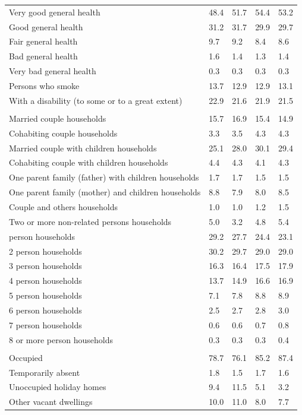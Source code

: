 \documentclass{article}
\begin{document}
\begin{table}[h]
\begin{tabular}{KTTTT}
    \hline
Very good general health & 48.4& 51.7&54.4& 53.2\\
Good general health & 31.2& 31.7& 29.9& 29.7\\
Fair general health & 9.7& 9.2&8.4& 8.6\\
Bad general health & 1.6& 1.4&1.3& 1.4\\
Very bad general health & 0.3& 0.3&0.3& 0.3\\
    \hline
Persons who smoke & 13.7& 12.9&12.9& 13.1\\
    \hline
With a disability (to some or to a great extent) & 22.9& 21.6&21.9& 21.5\\
\hline
    \\ 
    \hline
Married couple households & 15.7& 16.9& 15.4& 14.9\\
Cohabiting couple households & 3.3& 3.5& 4.3& 4.3\\
Married couple with children households & 25.1& 28.0& 30.1& 29.4\\
Cohabiting couple with children households & 4.4& 4.3& 4.1& 4.3\\
One parent family (father) with  children households & 1.7& 1.7& 1.5& 1.5\\
One parent family (mother) and children households & 8.8& 7.9& 8.0& 8.5\\
Couple and others households  & 1.0& 1.0& 1.2& 1.5\\
Two or more non-related persons households & 5.0& 3.2& 4.8& 5.4\\
     person households & 29.2& 27.7& 24.4& 23.1\\
2 person households & 30.2& 29.7& 29.0& 29.0\\
3 person households & 16.3& 16.4& 17.5& 17.9\\
4 person households & 13.7& 14.9& 16.6& 16.9\\
5 person households & 7.1& 7.8& 8.8& 8.9\\
6 person households & 2.5& 2.7& 2.8& 3.0\\
7 person households & 0.6& 0.6& 0.7& 0.8\\
8 or more person households & 0.3& 0.3& 0.3& 0.4\\
\hline
    \\ 
    \hline
Occupied & 78.7& 76.1& 85.2& 87.4\\
Temporarily absent & 1.8& 1.5& 1.7& 1.6\\
Unoccupied holiday homes &  9.4& 11.5&  5.1&  3.2\\
Other vacant dwellings & 10.0& 11.0&  8.0&  7.7\\
\hline
\end{tabular}
\end{table}
\end{document}
